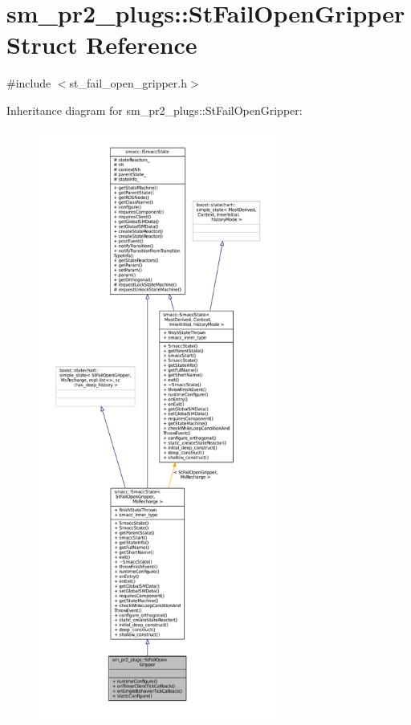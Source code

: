 \hypertarget{structsm__pr2__plugs_1_1StFailOpenGripper}{}\section{sm\+\_\+pr2\+\_\+plugs\+:\+:St\+Fail\+Open\+Gripper Struct Reference}
\label{structsm__pr2__plugs_1_1StFailOpenGripper}


{\ttfamily \#include $<$st\+\_\+fail\+\_\+open\+\_\+gripper.\+h$>$}



Inheritance diagram for sm\+\_\+pr2\+\_\+plugs\+:\+:St\+Fail\+Open\+Gripper\+:
\nopagebreak
\begin{figure}[H]
\begin{center}
\leavevmode
\includegraphics[height=550pt]{structsm__pr2__plugs_1_1StFailOpenGripper__inherit__graph}
\end{center}
\end{figure}


